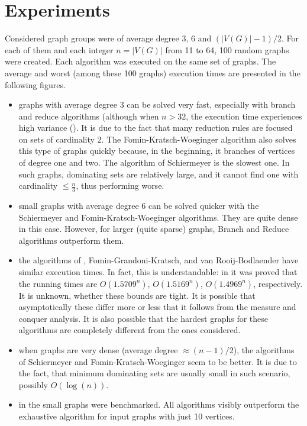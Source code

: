 \section{Experiments}
Considered graph groups were of average degree 3, 6 and $(|V(G)|-1)/2$. For each of them and each integer $n = |V(G)|$ from 11 to 64, 100 random graphs were created. Each algorithm was executed on the same set of graphs. The average and worst (among these 100 graphs) execution times are presented in the following figures.
\begin{itemize}
    \item graphs with average degree 3 can be solved very fast, especially with branch and reduce algorithms (although when $n > 32$, the execution time experiences high variance (). It is due to the fact that many reduction rules are focused on sets of cardinality 2. The Fomin-Kratsch-Woeginger algorithm also solves this type of graphs quickly because, in the beginning, it branches of vertices of degree one and two. The algorithm of Schiermeyer is the slowest one. In such graphs, dominating sets are relatively large, and it cannot find one with cardinality $\leq \frac{n}{3}$, thus performing worse.
    \item small graphs with average degree 6 can be solved quicker with the Schiermeyer and Fomin-Kratsch-Woeginger algorithms. They are quite dense in this case. However, for larger (quite sparse) graphs, Branch and Reduce algorithms outperform them.
    \item the algorithms of \citeauthor{GRANDONI2006209}, Fomin-Grandoni-Kratsch, and van Rooij-Bodlaender have similar execution times. In fact, this is understandable: in \cite{VANROOIJ20112147} it was proved that the running times are $O(1.5709^n)$, $O(1.5169^n)$, $O(1.4969^n)$, respectively. It is unknown, whether these bounds are tight. It is possible that asymptotically these differ more or less that it follows from the measure and conquer analysis. It is also possible that the hardest graphs for these algorithms are completely different from the ones considered. 
    \item when graphs are very dense (average degree $\approx(n-1)/2$), the algorithms of Schiermeyer and Fomin-Kratsch-Woeginger seem to be better. It is due to the fact, that minimum dominating sets are usually small in such scenario, possibly $O(\log(n))$.
    \item in the  small graphs were benchmarked. All algorithms visibly outperform the exhaustive algorithm for input graphs with just 10 vertices. 
\end{itemize}

